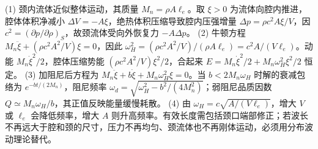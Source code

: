 (1) 颈内流体近似整体运动，其质量 \(M_n=\rho A\ell_e\)。取 \(\xi>0\) 为流体向腔内推进，腔体体积净减小 \(\Delta V=-A\xi\)，绝热体积压缩导致腔内压强增量 \(\Delta p=\rho c^2 A\xi/V\)，因 \(c^2=(\partial p/\partial\rho)_S\)，故颈流体受向外恢复力 \(-A\Delta p\)。
(2) 牛顿方程 \(M_n\ddot\xi+(\rho c^2 A^2/V)\xi=0\)，因此 \(\omega_H^2=(\rho c^2 A^2/V)/(\rho A\ell_e)=c^2A/(V\ell_e)\)。动能 \(M_n\dot\xi^2/2\)，腔体压缩势能 \((\rho c^2 A^2/V)\xi^2/2\)，合起来 \(E=M_n\dot\xi^2/2+M_n\omega_H^2\xi^2/2\) 恒定。
(3) 加阻尼后方程为 \(M_n\ddot\xi+b\dot\xi+M_n\omega_H^2\xi=0\)。当 \(b<2M_n\omega_H\) 时解的衰减包络为 \(e^{-bt/(2M_n)}\)，阻尼频率 \(\omega_d=\sqrt{\omega_H^2-b^2/(4M_n^2)}\)；弱阻尼品质因数 \(Q\simeq M_n\omega_H/b\)，其正值反映能量缓慢耗散。
(4) 由 \(\omega_H=c\sqrt{A/(V\ell_e)}\)，增大 \(V\) 或 \(\ell_e\) 会降低频率，增大 \(A\) 则升高频率。有效长度需包括颈口端部修正；若波长不再远大于腔和颈的尺寸，压力不再均匀、颈流体也不再刚体运动，必须用分布波动理论替代。
